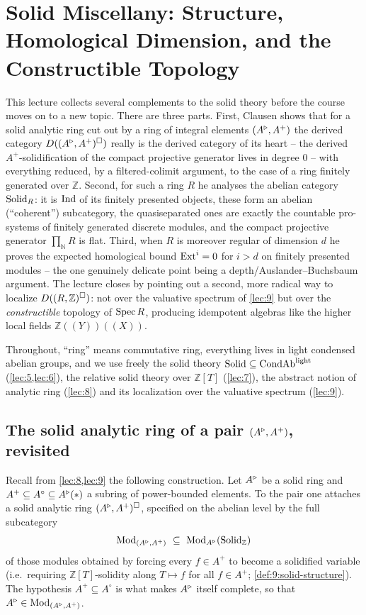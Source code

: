 \section{Solid Miscellany: Structure, Homological Dimension, and the Constructible Topology}
\label{lec:11}

This lecture collects several complements to the solid theory before the
course moves on to a new topic. There are three parts. First, Clausen shows
that for a solid analytic ring cut out by a ring of integral elements
$(A^{\triangleright},A^{+})$ the derived category $D((A^{\triangleright},A^{+})^{\square})$ really is the
derived category of its heart -- the derived $A^{+}$-solidification of the
compact projective generator lives in degree $0$ -- with everything reduced,
by a filtered-colimit argument, to the case of a ring finitely generated over
$\mathbb{Z}$. Second, for such a ring $R$ he analyses the abelian category
$\mathrm{Solid}_{R}$: it is $\operatorname{Ind}$ of its finitely presented objects, these form an
abelian (``coherent'') subcategory, the quasiseparated ones are exactly the
countable pro-systems of finitely generated discrete modules, and the compact
projective generator $\prod_{\mathbb{N}}R$ is flat. Third, when $R$ is
moreover regular of dimension $d$ he proves the expected homological bound
$\operatorname{Ext}^{i}=0$ for $i>d$ on finitely presented modules -- the one genuinely
delicate point being a depth/Auslander--Buchsbaum argument. The lecture closes
by pointing out a second, more radical way to localize $D((R,\mathbb{Z})^{
\square})$: not over the valuative spectrum of \cref{lec:9} but over the
\emph{constructible} topology of $\operatorname{Spec} R$, producing idempotent algebras like
the higher local fields $\mathbb{Z}(\!(Y)\!)(\!(X)\!)$.

Throughout, ``ring'' means commutative ring, everything lives in light
condensed abelian groups, and we use freely the solid theory
$\mathrm{Solid}\subseteq\mathrm{CondAb}^{\mathrm{light}}$ (\cref{lec:5,lec:6}), the relative solid theory over
$\mathbb{Z}[T]$ (\cref{lec:7}), the abstract notion of analytic ring
(\cref{lec:8}) and its localization over the valuative spectrum (\cref{lec:9}).

\subsection{The solid analytic ring of a pair \texorpdfstring{$(A^{\triangleright},A^{+})$}{(A,A+)}, revisited}

Recall from \cref{lec:8,lec:9} the following construction. Let $A^{\triangleright}$ be a
solid ring and $A^{+}\subseteq A^{\circ}\subseteq A^{\triangleright}(\ast)$ a subring of
power-bounded elements. To the pair one attaches a solid analytic ring
$(A^{\triangleright},A^{+})^{\square}$, specified on the abelian level by the full
subcategory
\begin{equation}
\label{eq:11:mod-pair}
\operatorname{Mod}_{(A^{\triangleright},A^{+})}\ \subseteq\ \operatorname{Mod}_{A^{\triangleright}}(\mathrm{Solid}_{\mathbb{Z}})
\end{equation}
of those modules obtained by forcing every $f\in A^{+}$ to become a solidified
variable (i.e.\ requiring $\mathbb{Z}[T]$-solidity along $T\mapsto f$ for all
$f\in A^{+}$; \cref{def:9:solid-structure}). The hypothesis $A^{+}\subseteq
A^{\circ}$ is what makes $A^{\triangleright}$ itself complete, so that $A^{\triangleright}\in\operatorname{Mod}_{(A^{\triangleright},A^{+})}$.

